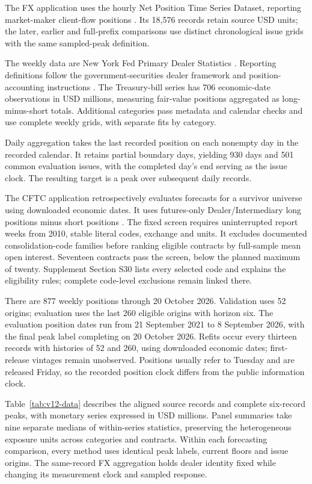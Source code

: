 \documentclass[11pt,a4paper]{article}
\begin{document}
The FX application uses the hourly Net Position Time Series Dataset, reporting market-maker client-flow positions \citep{dataset,wisniewski2020}. Its 18,576 records retain source USD units; the later, earlier and full-prefix comparisons use distinct chronological issue grids with the same sampled-peak definition.

The weekly data are New York Fed Primary Dealer Statistics \citep{nyfeddata}. Reporting definitions follow the government-securities dealer framework and position-accounting instructions \citep{fr2004_2013,fr2004_2024}. The Treasury-bill series has 706 economic-date observations in USD millions, measuring fair-value positions aggregated as long-minus-short totals. Additional categories pass metadata and calendar checks and use complete weekly grids, with separate fits by category.

Daily aggregation takes the last recorded position on each nonempty day in the recorded calendar. It retains partial boundary days, yielding 930 days and 501 common evaluation issues, with the completed day's end serving as the issue clock. The resulting target is a peak over subsequent daily records.

The CFTC application retrospectively evaluates forecasts for a survivor universe using downloaded economic dates. It uses futures-only Dealer/Intermediary long positions minus short positions \citep{cftcTFF}. The fixed screen requires uninterrupted report weeks from 2010, stable literal codes, exchange and units. It excludes documented consolidation-code families before ranking eligible contracts by full-sample mean open interest. Seventeen contracts pass the screen, below the planned maximum of twenty. Supplement Section S30 lists every selected code and explains the eligibility rules; complete code-level exclusions remain linked there.

There are 877 weekly positions through 20 October 2026. Validation uses 52 origins; evaluation uses the last 260 eligible origins with horizon six. The evaluation position dates run from 21 September 2021 to 8 September 2026, with the final peak label completing on 20 October 2026. Refits occur every thirteen records with histories of 52 and 260, using downloaded economic dates; first-release vintages remain unobserved. Positions usually refer to Tuesday and are released Friday, so the recorded position clock differs from the public information clock.

Table~\ref{tab:v12-data} describes the aligned source records and complete six-record peaks, with monetary series expressed in USD millions. Panel summaries take nine separate medians of within-series statistics, preserving the heterogeneous exposure units across categories and contracts. Within each forecasting comparison, every method uses identical peak labels, current floors and issue origins. The same-record FX aggregation holds dealer identity fixed while changing its measurement clock and sampled response.
\end{document}
